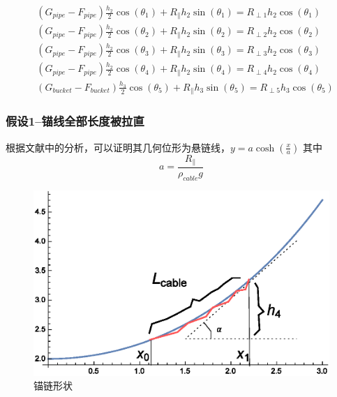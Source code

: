 \documentclass[a4paper,12pt]{ctexart}
\begin{document}
\begin{align}
&(G_{pipe}-F_{pipe})\frac{h_2}{2}\cos(\theta_1)+R_{\parallel}h_2\sin(\theta_1)=R_{\perp1}h_2\cos(\theta_1)\\
&(G_{pipe}-F_{pipe})\frac{h_2}{2}\cos(\theta_2)+R_{\parallel}h_2\sin(\theta_2)=R_{\perp2}h_2\cos(\theta_2)\\
&(G_{pipe}-F_{pipe})\frac{h_2}{2}\cos(\theta_3)+R_{\parallel}h_2\sin(\theta_3)=R_{\perp3}h_2\cos(\theta_3)\\
&(G_{pipe}-F_{pipe})\frac{h_2}{2}\cos(\theta_4)+R_{\parallel}h_2\sin(\theta_4)=R_{\perp4}h_2\cos(\theta_4)\\
&(G_{bucket}-F_{bucket}) \frac{h_3}{2} \cos(\theta_5) + R_{\parallel} h_3 \sin(\theta_5) = R_{\perp5} h_3 \cos(\theta_5)	\label{MechanicsEnd}
\end{align}
\subsubsection{假设1--锚线全部长度被拉直}
根据文献\cite{catenery}中的分析，可以证明其几何位形为悬链线，$y=a\cosh(\frac{x}{a})$
其中
\begin{equation}
a=\frac{R_{\parallel}}{\rho_{cable}g} \label{GeometryBegin}
\end{equation}
\begin{figure}[H]
\centering
\includegraphics[scale=0.8]{MyCatenary.eps}
\caption{锚链形状}
\end{figure}
\end{document}
